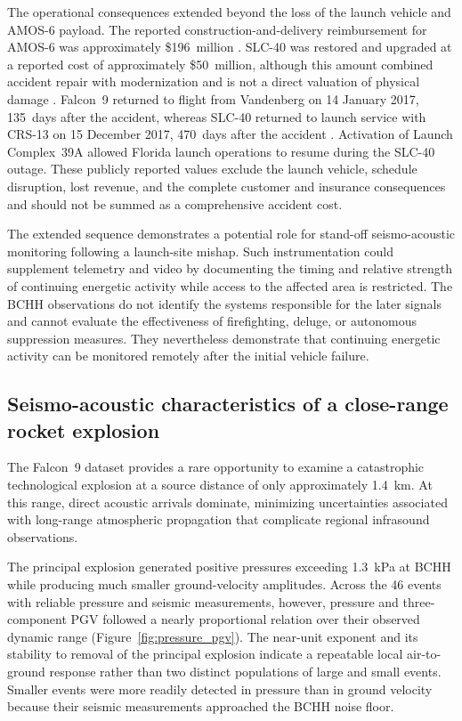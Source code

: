 \documentclass[]{seismica}
\begin{document}
The operational consequences extended beyond the loss of the launch vehicle
and AMOS-6 payload. The reported construction-and-delivery reimbursement for
AMOS-6 was approximately \$196~million
\citep{magan_amos6_2016}. SLC-40 was restored and upgraded at a reported cost
of approximately \$50~million, although this amount combined accident repair
with modernization and is not a direct valuation of physical damage
\citep{clark_slc40_2017}. Falcon~9 returned to flight from Vandenberg on
14 January 2017, 135~days after the accident, whereas SLC-40 returned to launch
service with CRS-13 on 15 December 2017, 470~days after the accident
\citep{spacex_iridium1_2017,spacex_crs13_2017}. Activation of Launch
Complex~39A allowed Florida launch operations to resume during the SLC-40
outage. These publicly reported values exclude the launch vehicle, schedule
disruption, lost revenue, and the complete customer and insurance consequences
and should not be summed as a comprehensive accident cost.

The extended sequence demonstrates a potential role for stand-off
seismo-acoustic monitoring following a launch-site mishap. Such instrumentation
could supplement telemetry and video by documenting the timing and relative
strength of continuing energetic activity while access to the affected area is
restricted. The BCHH observations do not identify the systems responsible for
the later signals and cannot evaluate the effectiveness of firefighting,
deluge, or autonomous suppression measures. They nevertheless demonstrate that
continuing energetic activity can be monitored remotely after the initial
vehicle failure.

\subsection{Seismo-acoustic characteristics of a close-range rocket explosion}
\label{sec:discussion_characteristics}

The Falcon~9 dataset provides a rare opportunity to examine a catastrophic technological explosion at a source distance of only approximately 1.4~km. At this range, direct acoustic arrivals dominate, minimizing uncertainties associated with long-range atmospheric propagation that complicate regional infrasound observations.

The principal explosion generated positive pressures exceeding 1.3~kPa at
BCHH while producing much smaller ground-velocity amplitudes. Across the 46
events with reliable pressure and seismic measurements, however, pressure and
three-component PGV followed a nearly proportional relation over their observed
dynamic range (Figure~\ref{fig:pressure_pgv}). The near-unit exponent and its
stability to removal of the principal explosion indicate a repeatable local
air-to-ground response rather than two distinct populations of large and small
events. Smaller events were more readily detected in pressure than in ground
velocity because their seismic measurements approached the BCHH noise floor.
\end{document}
